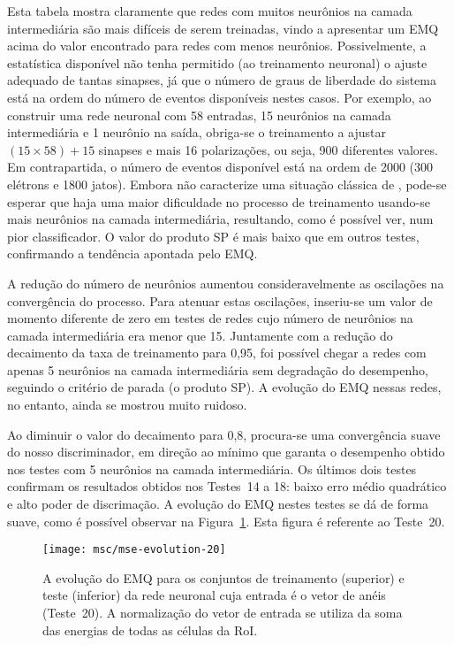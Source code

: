 Esta tabela mostra claramente que redes com muitos neurônios na camada
intermediária são mais difíceis de serem treinadas, vindo a apresentar um EMQ
acima do valor encontrado para redes com menos neurônios. Possivelmente, a
estatística disponível não tenha permitido (ao treinamento neuronal) o ajuste
adequado de tantas sinapses, já que o número de graus de liberdade do sistema
está na ordem do número de eventos disponíveis nestes casos. Por exemplo, ao
construir uma rede neuronal com 58 entradas, 15 neurônios na camada
intermediária e 1 neurônio na saída, obriga-se o treinamento a ajustar
$(15\times58)+15$ sinapses e mais 16 polarizações, ou seja, 900 diferentes
valores. Em contrapartida, o número de eventos disponível está na ordem de 2000
(300 elétrons e 1800 jatos). Embora não caracterize uma situação clássica de
 \cite{vantrees}, pode-se esperar que haja uma maior
dificuldade no processo de treinamento usando-se mais neurônios na camada
intermediária, resultando, como é possível ver, num pior classificador. O valor
do produto SP é mais baixo que em outros testes, confirmando a tendência
apontada pelo EMQ.

A redução do número de neurônios aumentou consideravelmente as oscilações na
convergência do processo. Para atenuar estas oscilações, inseriu-se um valor
de momento diferente de zero em testes de redes cujo número de neurônios na
camada intermediária era menor que 15. Juntamente com a redução do decaimento
da taxa de treinamento para 0,95, foi possível chegar a redes com apenas 5
neurônios na camada intermediária sem degradação do desempenho, seguindo o
critério de parada (o produto SP). A evolução do EMQ nessas redes, no entanto,
ainda se mostrou muito ruidoso.

Ao diminuir o valor do decaimento para 0,8, procura-se uma convergência suave
do nosso discriminador, em direção ao mínimo que garanta o desempenho obtido
nos testes com 5 neurônios na camada intermediária. Os últimos dois testes
confirmam os resultados obtidos nos Testes~14 a 18: baixo erro médio
quadrático e alto poder de discrimação. A evolução do EMQ nestes testes se dá
de forma suave, como é possível observar na Figura~\ref{fig:smooth-mse}. Esta
figura é referente ao Teste~20.

\begin{figure}
\begin{center}
\texttt{[image: msc/mse-evolution-20]}
\end{center}
\caption[A evolução do EMQ para os conjuntos de treinamento (superior) e teste
(inferior) da rede neuronal cuja entrada é o vetor de anéis (Teste~20).]{A
evolução do EMQ para os conjuntos de treinamento (superior) e teste (inferior)
da rede neuronal cuja entrada é o vetor de anéis (Teste~20). A normalização do
vetor de entrada se utiliza da soma das energias de todas as células da RoI.}
\label{fig:smooth-mse}
\end{figure}

